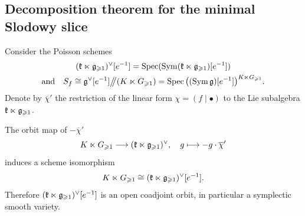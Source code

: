 %
%
%

\subsection{Decomposition theorem for the minimal Slodowy slice}

Consider the Poisson schemes
\begin{multline*}
	(\mathfrak k \ltimes \mathfrak g_{\geqslant 1})^\vee[e^{-1}] = \operatorname{Spec} (\operatorname{Sym}(\mathfrak k \ltimes \mathfrak g_{\geqslant 1})[e^{-1}]) \\ \text{and} \quad S_f \cong \mathfrak g^\vee[e^{-1}] \big/\!\!\big/ (K \ltimes G_{\geqslant 1}) = \operatorname{Spec}\big((\operatorname{Sym} \mathfrak g)[e^{-1}]\big)^{K \ltimes G_{\geqslant 1}}. 
\end{multline*}  
Denote by $\overline{\chi}'$ the restriction of the linear form $\chi = (f \mid \bullet)$ to the Lie subalgebra $\mathfrak k \ltimes \mathfrak g_{\geqslant 1}$.

\begin{lemma} \label{lemma:open-orbit}
	The orbit map of $-\overline{\chi}'$
	\[ K \ltimes G_{\geqslant 1} \longrightarrow (\mathfrak k \ltimes \mathfrak g_{\geqslant 1})^\vee, \quad g \longmapsto - g \cdot \overline{\chi}' \]
	induces a scheme isomorphism
	\[ K \ltimes G_{\geqslant 1} \cong (\mathfrak k \ltimes \mathfrak g_{\geqslant 1})^\vee[e^{-1}]. \]
	Therefore $(\mathfrak k \ltimes \mathfrak g_{\geqslant 1})^\vee[e^{-1}]$ is an open coadjoint orbit, in particular a symplectic smooth variety.
\end{lemma}

